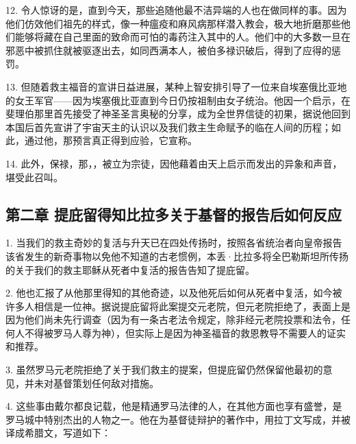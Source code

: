 12. 令人惊讶的是，直到今天，那些追随他最不洁异端的人也在做同样的事。因为他们仿效他们祖先的样式，像一种瘟疫和麻风病那样潜入教会，极大地折磨那些他们能够将藏在自己里面的致命而可怕的毒药注入其中的人。他们中的大多数一旦在邪恶中被抓住就被驱逐出去，如同西满本人，被伯多禄识破后，得到了应得的惩罚。\par

13. 但随着救主福音的宣讲日益进展，某种上智安排引导了一位来自埃塞俄比亚地的女王军官——因为埃塞俄比亚直到今日仍按祖制由女子统治。他因一个启示，在斐理伯那里首先接受了神圣圣言奥秘的分享，成为全世界信徒的初果，据说他回到本国后首先宣讲了宇宙天主的认识以及我们救主生命赋予的临在人间的历程；如此，通过他，那预言真正得到应验，它宣称。\par

14. 此外，保禄，那，，被立为宗徒，因他藉着由天上启示而发出的异象和声音，堪受此召叫。\par


\subsection{第二章 提庇留得知比拉多关于基督的报告后如何反应}

1. 当我们的救主奇妙的复活与升天已在四处传扬时，按照各省统治者向皇帝报告该省发生的新奇事物以免他不知道的古老惯例，本丢·比拉多将全巴勒斯坦所传扬的关于我们的救主耶稣从死者中复活的报告告知了提庇留。\par

2. 他也汇报了从他那里得知的其他奇迹，以及他死后如何从死者中复活，如今被许多人相信是一位神。据说提庇留将此案提交元老院，但元老院拒绝了，表面上是因为他们尚未先行调查（因为有一条古老法令规定，除非经元老院投票和法令，任何人不得被罗马人尊为神），但实际上是因为神圣福音的救恩教导不需要人的证实和推荐。\par

3. 虽然罗马元老院拒绝了关于我们救主的提案，但提庇留仍然保留他最初的意见，并未对基督策划任何敌对措施。\par

4. 这些事由戴尔都良记载，他是精通罗马法律的人，在其他方面也享有盛誉，是罗马城中特别杰出的人物之一。他在为基督徒辩护的著作中，用拉丁文写成，并被译成希腊文，写道如下：\par

